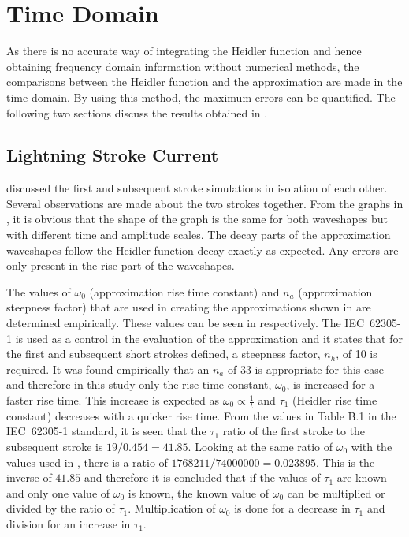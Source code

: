 \section{Time Domain}
\label{sec:discussion_time_domain}
As there is no accurate way of integrating the Heidler function and hence obtaining frequency domain information without numerical methods, the comparisons between the Heidler function and the approximation are made in the time domain. By using this method, the maximum errors can be quantified. The following two sections discuss the results obtained in .

\subsection{Lightning Stroke Current}
\label{sub:discussion_lightning_stroke_current}
 discussed the first and subsequent stroke simulations in isolation of each other. Several observations are made about the two strokes together. From the graphs in , it is obvious that the shape of the graph is the same for both waveshapes but with different time and amplitude scales. The decay parts of the approximation waveshapes follow the Heidler function decay exactly as expected. Any errors are only present in the rise part of the waveshapes.

The values of $\omega_0$ (approximation rise time constant) and $n_a$ (approximation steepness factor) that are used in creating the approximations shown in  are determined empirically. These values can be seen in  respectively. The IEC~62305-1 is used as a control in the evaluation of the approximation and it states that for the first and subsequent short strokes defined, a steepness factor, $n_h$, of 10 is required. It was found empirically that an $n_a$ of 33 is appropriate for this case and therefore in this study only the rise time constant, $\omega_0$, is increased for a faster rise time. This increase is expected as $\omega_0 \propto \frac{1}{t}$ and $\tau_1$ (Heidler rise time constant) decreases with a quicker rise time. From the values in Table B.1 in the IEC~62305-1 standard, it is seen that the $\tau_1$ ratio of the first stroke to the subsequent stroke is $19/0.454 = 41.85$. Looking at the same ratio of $\omega_0$ with the values used in , there is a ratio of $1 768 211/74 000 000 = 0.023895$. This is the inverse of $41.85$ and therefore it is concluded that if the values of $\tau_1$ are known and only one value of $\omega_0$ is known, the known value of $\omega_0$ can be multiplied or divided by the ratio of $\tau_1$. Multiplication of $\omega_0$ is done for a decrease in $\tau_1$ and division for an increase in $\tau_1$.

